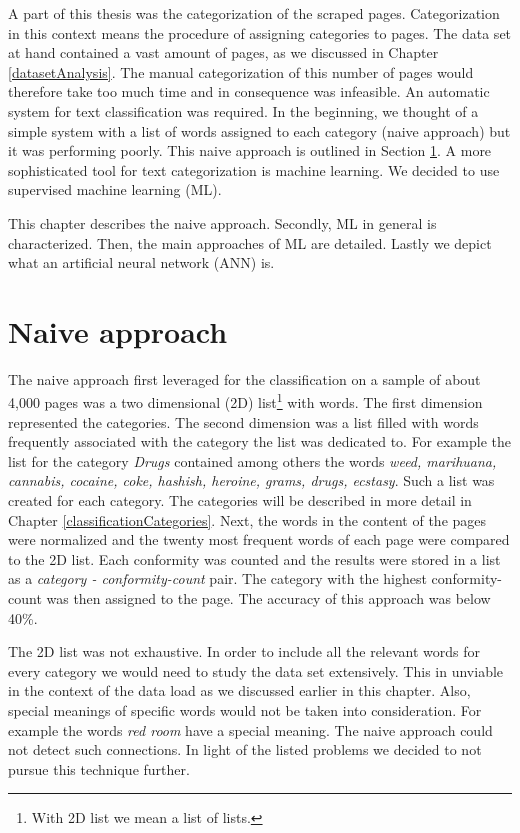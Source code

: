 \label{classification}
A part of this thesis was the categorization of the scraped pages. Categorization in this context means the procedure of assigning categories to pages. The data set at hand contained a vast amount of pages, as we discussed in Chapter \ref{datasetAnalysis}. The manual categorization of this number of pages would therefore take too much time and in consequence was infeasible. An automatic system for text classification was required. In the beginning, we thought of a simple system with a list of words assigned to each category (naive approach) but it was performing poorly. This naive approach is outlined in Section \ref{naiveApproach}. A more sophisticated tool for text categorization is machine learning. We decided to use supervised machine learning (ML).

This chapter describes the naive approach. Secondly, ML in general is characterized. Then, the main approaches of ML are detailed. Lastly we depict what an artificial neural network (ANN) is.

 \section{Naive approach} \label{naiveApproach}
The naive approach first leveraged for the classification on a sample of about 4,000 pages was a two dimensional (2D) list\footnote{With 2D list we mean a list of lists.} with words. The first dimension represented the categories. The second dimension was a list filled with words frequently associated with the category the list was dedicated to. For example the list for the category \textit{Drugs} contained among others the words \textit{weed, marihuana, cannabis, cocaine, coke, hashish, heroine, grams, drugs, ecstasy}. Such a list was created for each category. The categories will be described in more detail in Chapter \ref{classificationCategories}. Next, the words in the content of the pages were normalized and the twenty most frequent words of each page were compared to the 2D list. Each conformity was counted and the results were stored in a list as a \textit{category - conformity-count} pair. The category with the highest conformity-count was then assigned to the page. The accuracy of this approach was below 40\%.

The 2D list was not exhaustive. In order to include all the relevant words for every category we would need to study the data set extensively. This in unviable in the context of the data load as we discussed earlier in this chapter. Also, special meanings of specific words would not be taken into consideration. For example the words \textit{red room} have a special meaning. The naive approach could not detect such connections. In light of the listed problems we decided to not pursue this technique further.


